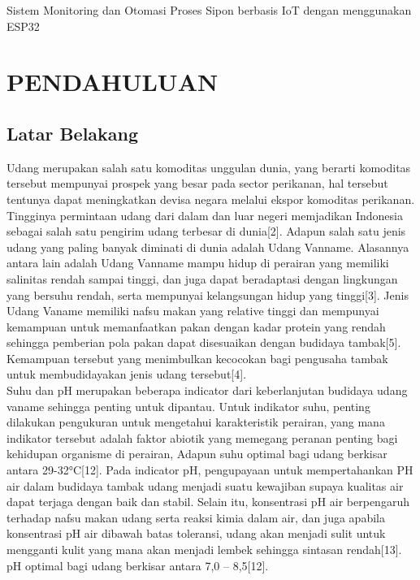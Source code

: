 \begin{center}
\noindent \huge Sistem Monitoring dan Otomasi Proses Sipon berbasis IoT dengan menggunakan ESP32
\end{center}

\section{PENDAHULUAN}


\subsection{Latar Belakang}
\label{sec:latarbelakang}

Udang merupakan salah satu komoditas unggulan dunia, yang berarti komoditas tersebut mempunyai prospek yang besar pada sector perikanan, hal tersebut tentunya dapat meningkatkan devisa negara melalui ekspor komoditas perikanan. Tingginya permintaan udang dari dalam dan luar negeri memjadikan Indonesia sebagai salah satu pengirim udang terbesar di dunia[2]. Adapun salah satu jenis udang yang paling banyak diminati di dunia adalah Udang Vanname. Alasannya antara lain adalah Udang Vanname mampu hidup di perairan yang memiliki salinitas rendah sampai tinggi, dan juga dapat beradaptasi dengan lingkungan yang bersuhu rendah, serta mempunyai kelangsungan hidup yang tinggi[3]. Jenis Udang Vaname memiliki nafsu makan yang relative tinggi dan mempunyai kemampuan untuk memanfaatkan pakan dengan kadar protein yang rendah sehingga pemberian pola pakan dapat disesuaikan dengan budidaya tambak[5]. Kemampuan tersebut yang menimbulkan kecocokan bagi pengusaha tambak untuk membudidayakan jenis udang tersebut[4]. \\

Suhu dan pH merupakan beberapa indicator dari keberlanjutan budidaya udang vaname sehingga penting untuk dipantau. Untuk indikator suhu, penting dilakukan pengukuran untuk mengetahui karakteristik perairan, yang mana indikator tersebut adalah faktor abiotik yang memegang peranan penting bagi kehidupan organisme di perairan, Adapun suhu optimal bagi udang berkisar antara 29-32°C[12]. Pada indicator pH, pengupayaan untuk mempertahankan PH air dalam budidaya tambak udang menjadi suatu kewajiban supaya kualitas air dapat terjaga dengan baik dan stabil. Selain itu, konsentrasi pH air berpengaruh terhadap nafsu makan udang serta reaksi kimia dalam air, dan juga apabila konsentrasi pH air dibawah batas toleransi, udang akan menjadi sulit untuk mengganti kulit yang mana akan menjadi lembek sehingga sintasan rendah[13]. pH optimal bagi udang berkisar antara 7,0 – 8,5[12]. \\

